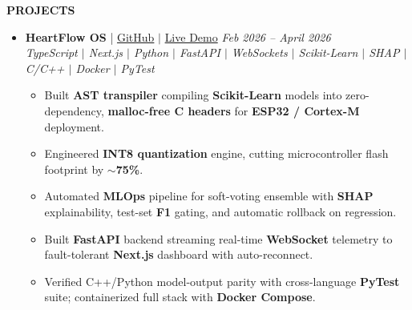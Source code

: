 \documentclass[10pt,article]{article}
\newcommand{\resheading}[1]{{\small \colorbox{mygrey}{\begin{minipage}{\textwidth}\textbf{#1 \vphantom{p\^{E}}}\end{minipage}}}}
\begin{document}
\noindent
\resheading{\textbf{PROJECTS}}
\begin{itemize}[leftmargin=*]\small
\item \textbf{HeartFlow OS} | \href{https://github.com/IDKHowToCodeFR/HEARTFLOW_OS}{GitHub} $|$ \href{https://idkhowtocodefr.github.io/HEARTFLOW_OS}{Live Demo} \hfill \textit{Feb 2026 -- April 2026} \\
\textit{\footnotesize TypeScript $|$ Next.js $|$ Python $|$ FastAPI $|$ WebSockets $|$ Scikit-Learn $|$ SHAP $|$ C/C++ $|$ Docker $|$ PyTest}
\begin{itemize}[noitemsep, leftmargin=*]\small
\item Built \textbf{AST transpiler} compiling \textbf{Scikit-Learn} models into zero-dependency, \textbf{malloc-free C headers} for \textbf{ESP32 / Cortex-M} deployment.
\item Engineered \textbf{INT8 quantization} engine, cutting microcontroller flash footprint by \textbf{$\sim$75\%}.
\item Automated \textbf{MLOps} pipeline for soft-voting ensemble with \textbf{SHAP} explainability, test-set \textbf{F1} gating, and automatic rollback on regression.
\item Built \textbf{FastAPI} backend streaming real-time \textbf{WebSocket} telemetry to fault-tolerant \textbf{Next.js} dashboard with auto-reconnect.
\item Verified C++/Python model-output parity with cross-language \textbf{PyTest} suite; containerized full stack with \textbf{Docker Compose}.
\end{itemize}


\end{itemize}
\end{document}
